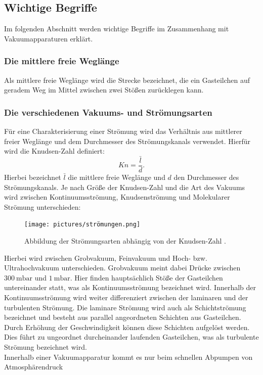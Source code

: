 \subsection{Wichtige Begriffe}
Im folgenden Abschnitt werden wichtige Begriffe im Zusammenhang mit Vakuumapparaturen
erklärt.

\subsubsection*{Die mittlere freie Weglänge}
Als mittlere freie Weglänge wird die Strecke bezeichnet, die ein Gasteilchen
auf geradem Weg im Mittel zwischen zwei Stößen zurücklegen kann.

\subsubsection*{Die verschiedenen Vakuums- und Strömungsarten}
Für eine Charakterisierung einer Strömung wird das Verhältnis aus mittlerer
freier Weglänge und dem Durchmesser des Strömungskanals verwendet. Hierfür wird die
Knudsen-Zahl definiert:
\begin{equation}
 Kn = \frac{\bar{l}}{d}.
\end{equation}
Hierbei bezeichnet $\bar{l}$ die mittlere freie Weglänge und $d$ den Durchmesser
des Strömungskanals. Je nach Größe der Knudsen-Zahl und die Art des Vakuums wird
zwischen Kontinuumsströmung, Knudsenströmung und Molekularer Strömung unterschieden:
\begin{figure}[H]
  \centering
  \texttt{[image: pictures/strömungen.png]}
  \label{fig:strömung}
  \caption{Abbildung der Strömungsarten abhängig von der Knudsen-Zahl \cite{pfeiffer}.}
\end{figure}
\noindent
Hierbei wird zwischen Grobvakuum, Feinvakuum und Hoch- bzw. Ultrahochvakuum unterschieden.
Grobvakuum meint dabei Drücke zwischen $\SI{300}{\milli\bar}$ und $\SI{1}{\milli\bar}$.
Hier finden hauptsächlich Stöße der Gasteilchen untereinander statt, was als Kontinuumsströmung
bezeichnet wird.
Innerhalb der Kontinuumsströmung wird weiter differenziert zwischen der laminaren
und der turbulenten Strömung. Die laminare Strömung wird auch als Schichtströmung
bezeichnet und besteht aus parallel angeordneten Schichten aus Gasteilchen. Durch
Erhöhung der Geschwindigkeit können diese Schichten aufgelöst werden. Dies führt
zu ungeordnet durcheinander laufenden Gasteilchen, was als turbulente Strömung
bezeichnet wird.\\
Innerhalb einer Vakuumapparatur kommt es nur beim schnellen Abpumpen von Atmosphärendruck
